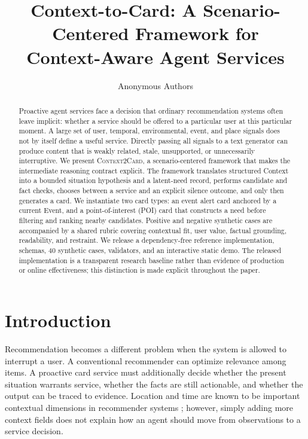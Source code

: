\documentclass[10pt]{article}
\title{Context-to-Card: A Scenario-Centered Framework for\\
Context-Aware Agent Services}
\author{Anonymous Authors}
\date{}
\newcommand{\method}{\textsc{Context2Card}}
\begin{document}
\maketitle

\begin{abstract}
Proactive agent services face a decision that ordinary recommendation systems often leave implicit: whether a service should be offered to a particular user at this particular moment. A large set of user, temporal, environmental, event, and place signals does not by itself define a useful service. Directly passing all signals to a text generator can produce content that is weakly related, stale, unsupported, or unnecessarily interruptive. We present \method{}, a scenario-centered framework that makes the intermediate reasoning contract explicit. The framework translates structured Context into a bounded situation hypothesis and a latent-need record, performs candidate and fact checks, chooses between a service and an explicit silence outcome, and only then generates a card. We instantiate two card types: an event alert card anchored by a current Event, and a point-of-interest (POI) card that constructs a need before filtering and ranking nearby candidates. Positive and negative synthetic cases are accompanied by a shared rubric covering contextual fit, user value, factual grounding, readability, and restraint. We release a dependency-free reference implementation, schemas, 40 synthetic cases, validators, and an interactive static demo. The released implementation is a transparent research baseline rather than evidence of production or online effectiveness; this distinction is made explicit throughout the paper.
\end{abstract}

\section{Introduction}

Recommendation becomes a different problem when the system is allowed to interrupt a user. A conventional recommender can optimize relevance among items. A proactive card service must additionally decide whether the present situation warrants service, whether the facts are still actionable, and whether the output can be traced to evidence. Location and time are known to be important contextual dimensions in recommender systems \citep{adomavicius2011context}; however, simply adding more context fields does not explain how an agent should move from observations to a service decision.
\end{document}
